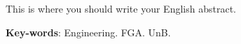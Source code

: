 \begin{resumo}
This is where you should write your English abstract.
 \vspace{\onelineskip}
    
 \noindent
 \textbf{Key-words}: Engineering. FGA. UnB.
\end{resumo}
